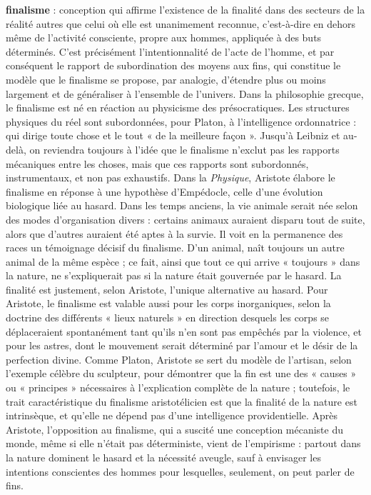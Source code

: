 {\bf finalisme} : conception qui affirme l’existence de la finalité dans des secteurs de la
réalité autres que celui où elle est unanimement reconnue, c’est-à-dire en dehors
même de l’activité consciente, propre aux
hommes, appliquée à des buts déterminés.
C’est précisément l’intentionnalité de
l'acte de l’homme, et par conséquent le
rapport de subordination des moyens aux
fins, qui constitue le modèle que le finalisme se propose, par analogie, d’étendre
plus ou moins largement et de généraliser
à l’ensemble de l’univers.
Dans la philosophie grecque, le finalisme est né en réaction au physicisme des
présocratiques. Les structures physiques
du réel sont subordonnées, pour Platon, à
l'intelligence ordonnatrice : qui dirige
toute chose et le tout « de la meilleure
façon ». Jusqu'à Leibniz et au-delà, on
reviendra toujours à l’idée que le finalisme n’exclut pas les rapports mécaniques entre les choses, mais que ces
rapports sont subordonnés, instrumentaux, et non pas exhaustifs. Dans la {\it Physique},
Aristote élabore le finalisme en
réponse à une hypothèse d’Empédocle,
celle d’une évolution biologique liée au
hasard. Dans les temps anciens, la vie animale serait née selon des modes d’organisation divers : certains animaux auraient
disparu tout de suite, alors que d’autres
auraient été aptes à la survie. Il voit en
la permanence des races un témoignage
décisif du finalisme. D’un animal, naît
toujours un autre animal de la même
espèce ; ce fait, ainsi que tout ce qui arrive
« toujours » dans la nature, ne s’expliquerait pas si la nature était gouvernée par
le hasard. La finalité est justement, selon
Aristote, l’unique alternative au hasard.
Pour Aristote, le finalisme est valable
aussi pour les corps inorganiques, selon la
doctrine des différents « lieux naturels »
en direction desquels les corps se déplaceraient spontanément tant qu’ils n’en sont
pas empêchés par la violence, et pour les
astres, dont le mouvement serait déterminé
par l’amour et le désir de la perfection
divine. Comme Platon, Aristote se sert du
modèle de l’artisan, selon l'exemple célèbre
du sculpteur, pour démontrer que la fin
est une des « causes » ou « principes »
nécessaires à l’explication complète de la
nature ; toutefois, le trait caractéristique
du finalisme aristotélicien est que la finalité de la nature est intrinsèque, et qu’elle
ne dépend pas d’une intelligence providentielle. Après Aristote, l'opposition au
finalisme, qui a suscité une conception
mécaniste du monde, même si elle n’était
pas déterministe, vient de l’empirisme :
partout dans la nature dominent le hasard
et la nécessité aveugle, sauf à envisager
les intentions conscientes des hommes
pour lesquelles, seulement, on peut parler
de fins.

